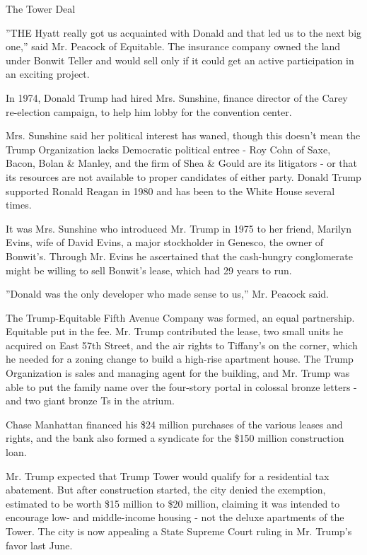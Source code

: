 The Tower Deal

''THE Hyatt really got us acquainted with Donald and that led us to the
next big one,'' said Mr. Peacock of Equitable. The insurance company
owned the land under Bonwit Teller and would sell only if it could get
an active participation in an exciting project.

In 1974, Donald Trump had hired Mrs. Sunshine, finance director of the
Carey re-election campaign, to help him lobby for the convention center.

Mrs. Sunshine said her political interest has waned, though this doesn't
mean the Trump Organization lacks Democratic political entree - Roy Cohn
of Saxe, Bacon, Bolan \& Manley, and the firm of Shea \& Gould are its
litigators - or that its resources are not available to proper
candidates of either party. Donald Trump supported Ronald Reagan in 1980
and has been to the White House several times.

It was Mrs. Sunshine who introduced Mr. Trump in 1975 to her friend,
Marilyn Evins, wife of David Evins, a major stockholder in Genesco, the
owner of Bonwit's. Through Mr. Evins he ascertained that the cash-hungry
conglomerate might be willing to sell Bonwit's lease, which had 29 years
to run.

''Donald was the only developer who made sense to us,'' Mr. Peacock
said.

The Trump-Equitable Fifth Avenue Company was formed, an equal
partnership. Equitable put in the fee. Mr. Trump contributed the lease,
two small units he acquired on East 57th Street, and the air rights to
Tiffany's on the corner, which he needed for a zoning change to build a
high-rise apartment house. The Trump Organization is sales and managing
agent for the building, and Mr. Trump was able to put the family name
over the four-story portal in colossal bronze letters - and two giant
bronze Ts in the atrium.

Chase Manhattan financed his \$24 million purchases of the various
leases and rights, and the bank also formed a syndicate for the \$150
million construction loan.

Mr. Trump expected that Trump Tower would qualify for a residential tax
abatement. But after construction started, the city denied the
exemption, estimated to be worth \$15 million to \$20 million, claiming
it was intended to encourage low- and middle-income housing - not the
deluxe apartments of the Tower. The city is now appealing a State
Supreme Court ruling in Mr. Trump's favor last June.

